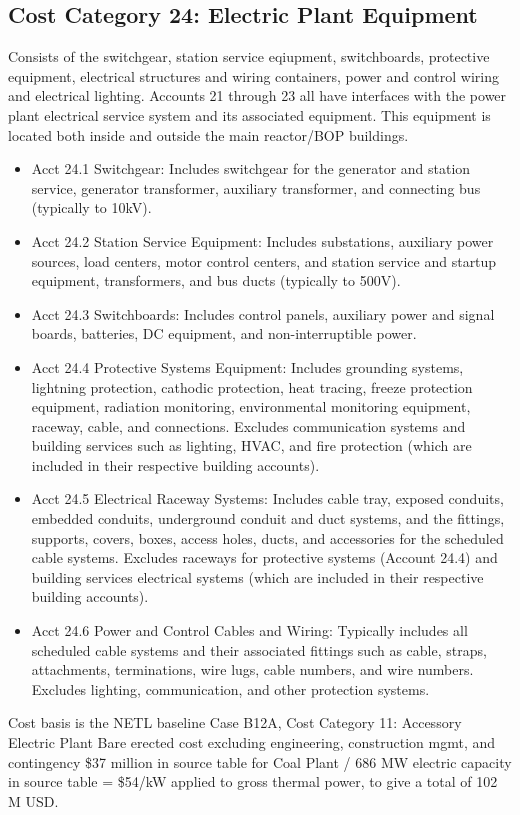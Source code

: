 
\subsection{Cost Category 24: Electric Plant Equipment}
Consists of the switchgear, station service eqiupment, switchboards, protective equipment, electrical structures and 
wiring containers, power and control wiring and electrical lighting.  Accounts 21 through 23 all have interfaces with the power plant electrical service system and its associated equipment. This equipment is located both inside
and outside the main reactor/BOP buildings.

\begin{itemize}

\item Acct 24.1 Switchgear: Includes switchgear for the generator and station service, generator
transformer, auxiliary transformer, and connecting bus (typically to 10kV).

\item  Acct 24.2 Station Service Equipment: Includes substations, auxiliary power sources, load
centers, motor control centers, and station service and startup equipment,
transformers, and bus ducts (typically to 500V).

\item  Acct 24.3 Switchboards: Includes control panels, auxiliary power and signal boards,
batteries, DC equipment, and non-interruptible power.

\item  Acct 24.4 Protective Systems Equipment: Includes grounding systems, lightning
protection, cathodic protection, heat tracing, freeze protection equipment,
radiation monitoring, environmental monitoring equipment, raceway, cable, and
connections. Excludes communication systems and building
services such as lighting, HVAC, and fire protection (which are included in their
respective building accounts).

\item  Acct 24.5 Electrical Raceway Systems: Includes cable tray, exposed conduits, embedded
conduits, underground conduit and duct systems, and the fittings, supports,
covers, boxes, access holes, ducts, and accessories for the scheduled cable
systems. Excludes raceways for protective systems (Account 24.4) and building
services electrical systems (which are included in their respective building
accounts).

\item  Acct 24.6 Power and Control Cables and Wiring: Typically includes all scheduled cable
systems and their associated fittings such as cable, straps, attachments,
terminations, wire lugs, cable numbers, and wire numbers. Excludes lighting,
communication, and other protection systems.

\end{itemize}

Cost basis is the NETL baseline Case B12A, Cost Category 11: Accessory Electric Plant Bare erected cost excluding engineering, construction mgmt, and
contingency \$37 million in source table for Coal Plant / 686 MW electric capacity in source table = \$54/kW applied to gross 
thermal power, to give a total of 102 M USD.